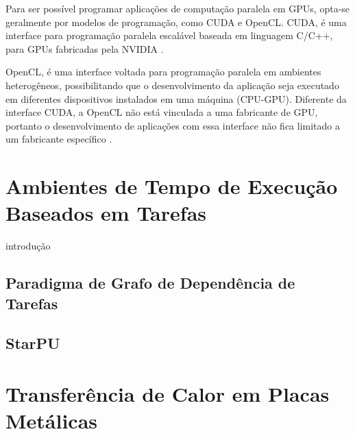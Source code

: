 Para ser possível programar aplicações de computação paralela em GPUs, opta-se geralmente por modelos de programação, como CUDA e OpenCL.
CUDA, é uma interface para programação paralela escalável baseada em linguagem C/C++, para GPUs fabricadas pela NVIDIA \cite{hennessy2014organizaccao}.

OpenCL, é uma interface voltada para programação paralela em ambientes heterogêneos, possibilitando que o desenvolvimento da aplicação seja executado em diferentes dispositivos instalados em uma máquina (CPU-GPU).
Diferente da interface CUDA, a OpenCL não está vinculada a uma fabricante de GPU, portanto o desenvolvimento de aplicações com essa interface não fica limitado a um fabricante específico \cite{opencl:2018}.

\section{Ambientes de Tempo de Execução Baseados em Tarefas}
introdução 

\subsection{Paradigma de Grafo de Dependência de Tarefas}

\subsection{StarPU}

\section{Transferência de Calor em Placas Metálicas}